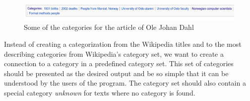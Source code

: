 

\begin{figure}[H]
\centering
\includegraphics[width=\textwidth]{Dumps/imgs/olejohandahl-categories.png}
\caption[Categories for an Wikipedia article]{Some of the categories for the article of Ole Johan Dahl}
\label{fig: olejohandahl_categories}
\end{figure}




Instead of creating a categorization from the Wikipedia titles and to the most describing categories from Wikipedia's category set, we want to create a connection to a category in a predefined category set. This set of categories should be presented as the desired output and be so simple that it can be understood by the users of the program. The category set should also contain a special category \emph{unknown} for texts where no category is found.

